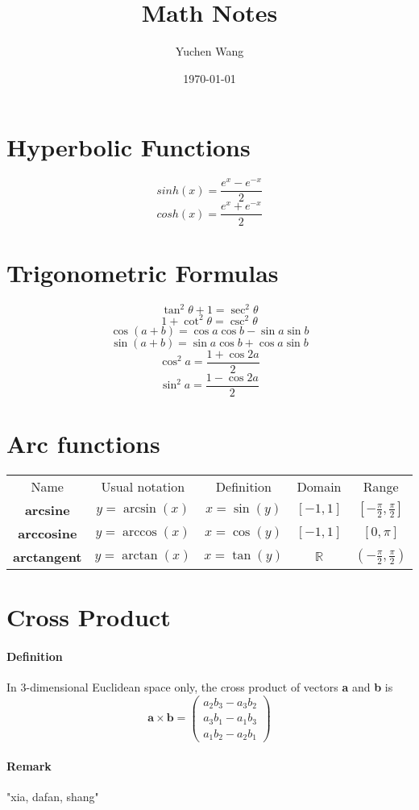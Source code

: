 \documentclass[11pt]{article}
\title{Math Notes}
\author{Yuchen Wang}
\date{\today}
\newcommand{\tb}[1]{\textbf{#1}}
\newcommand{\real}[0]{\mathbb{R}}
\begin{document}
	\maketitle
	\tableofcontents
	\newpage
\section{Hyperbolic Functions} 
$$sinh(x) = \frac{e^x - e^{-x}}{2}$$
$$cosh(x) = \frac{e^x + e^{-x}}{2}$$
\section{Trigonometric Formulas}
$$\tan^2{\theta} + 1 = \sec^2{\theta}$$
$$1 + \cot^2{\theta} = \csc^2{\theta}$$
$$\cos{(a+b)} = \cos{a}\cos{b}-\sin{a}\sin{b}$$
$$\sin{(a+b)} = \sin{a}\cos{b}+\cos{a}\sin{b}$$
$$\cos^2{a} = \frac{1+\cos{2a}}{2} $$
$$\sin^2{a} = \frac{1-\cos{2a}}{2} $$
\section{Arc functions}
\begin{center}
\begin{tabular}{ c c c c c}
 Name & Usual notation & Definition & Domain & Range \\ 
 \tb{arcsine} & $y = \arcsin(x)$ & $x = \sin(y)$ & $[-1, 1]$ & $[-\frac{\pi}{2}, \frac{\pi}{2}] $ \\  
 \tb{arccosine} & $y = \arccos(x)$ & $x = \cos(y)$ & $[-1, 1]$ & $[0, \pi]$   \\
 \tb{arctangent} & $y = \arctan(x)$ & $x = \tan(y)$ & $\real$ & $(-\frac{\pi}{2}, \frac{\pi}{2})$   \\
\end{tabular}
\end{center}

\section{Cross Product}
\paragraph{Definition} In 3-dimensional Euclidean space only, the cross product of vectors \tb{a} and \tb{b} is 
$$\tb{a} \times \tb{b} = \begin{pmatrix}a_2b_3 - a_3b_2\\ a_3b_1-a_1b_3\\a_1b_2-a_2b_1\end{pmatrix}$$ 
\paragraph{Remark} "xia, dafan, shang"
\end{document}
